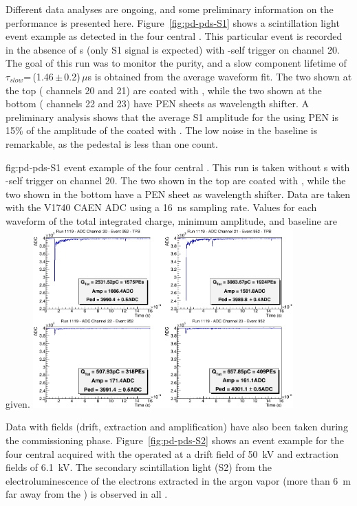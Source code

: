 Different data analyses are ongoing, and some preliminary information on the   performance is presented here. Figure~\ref{fig:pd-pds-S1} shows a scintillation light event example as detected in the four central . This particular event is recorded in the absence of \efield{}s (only S1 signal is expected) with -self trigger on  channel 20. The goal of this run was to monitor the  purity, and a slow component lifetime of $\tau_{slow}$=\,(1.46\,$\pm$\,0.2)\,$\mu$s is obtained from the average waveform fit. The two  shown at the top ( channels 20 and 21) are coated with , while the two shown at the bottom ( channels 22 and 23) have PEN sheets as wavelength shifter. A preliminary analysis shows that the average S1 amplitude for the  using PEN is 15\% of the amplitude of the  coated with . The low noise in the baseline is remarkable, as the pedestal  is less than one  count. 

\begin{dunefigure}{fig:pd-pds-S1} { event example of the four central . This run is taken without \efield{}s with -self trigger on  channel 20. The two  shown in the top are coated with , while the two shown in the bottom have a PEN sheet as wavelength shifter. Data are taken with the V1740 CAEN ADC using a \SI{16}{ns} sampling rate. Values for each waveform of the total integrated charge, minimum amplitude, and baseline are given.}
\includegraphics[width=0.75\textwidth]{graphics/dppd_S1.png}
\end{dunefigure}

Data with fields (drift, extraction and amplification) have also been taken during the commissioning phase. Figure~\ref{fig:pd-pds-S2} shows an event example for the four central  acquired with the  operated at a drift field of \SI{50}{kV} and extraction fields of \SI{6.1}{kV}. The secondary scintillation light (S2) from the electroluminescence of the electrons extracted in the argon vapor (more than \SI{6}{m} far away from the ) is observed in all .

